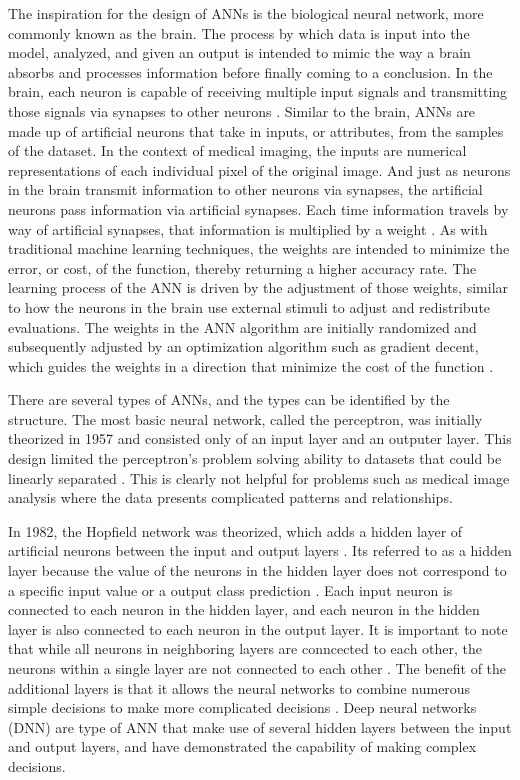 \documentclass[sigconf]{acmart}
\begin{document}
The inspiration for the design of ANNs is the biological neural network, more commonly known as the brain. The process by which data is input into the model, analyzed, and given an output is intended to mimic the way a brain absorbs and processes information before finally coming to a conclusion. In the brain, each neuron is capable of receiving multiple input signals and transmitting those signals via  synapses to other neurons \cite{cite05}. Similar to the brain, ANNs are made up of artificial neurons that take in inputs, or attributes, from the samples of the dataset. In the context of medical imaging, the inputs are numerical representations of each individual pixel of the original image. And just as neurons in the brain transmit information to other neurons via synapses, the artificial neurons pass information via artificial synapses. Each time information travels by way of artificial synapses, that information is multiplied by a weight \cite{cite05}. As with traditional machine learning techniques, the weights are intended to minimize the error, or cost, of the function, thereby returning a higher accuracy rate. The learning process of the ANN is driven by the adjustment of those weights, similar to how the neurons in the brain use external stimuli to adjust and redistribute evaluations. The weights in the ANN algorithm are initially randomized and subsequently adjusted by an optimization algorithm such as gradient decent, which guides the weights in a direction that minimize the cost of the function \cite{cite05}. 

There are several types of ANNs, and the types can be identified by the structure. The most basic neural network, called the perceptron, was initially theorized in 1957 and consisted only of an input layer and an outputer layer. This design limited the perceptron's problem solving ability to datasets that could be linearly separated \cite{cite08}. This is clearly not helpful for problems such as medical image analysis where the data presents complicated patterns and relationships.

In 1982, the Hopfield network was theorized, which adds a hidden layer of artificial neurons between the input and output layers \cite{cite08}. Its referred to as a hidden layer because the value of the neurons in the hidden layer does not correspond to a specific input value or a output class prediction \cite{cite05}. Each input neuron is connected to each neuron in the hidden layer, and each neuron in the hidden layer is also connected to each neuron in the output layer. It is important to note that while all neurons in neighboring layers are conncected to each other, the neurons within a single layer are not connected to each other \cite{cite06}. The benefit of the additional layers is that it allows the neural networks to combine numerous simple decisions to make more complicated decisions \cite{cite05}. Deep neural networks (DNN) are type of ANN that make use of several hidden layers between the input and output layers, and have demonstrated the capability of making complex decisions.
\end{document}
